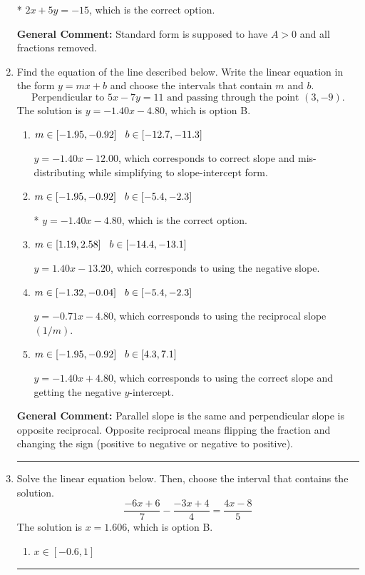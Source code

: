 \documentclass{extbook}[14pt]
\newcommand{\litem}[1]{\item #1

\rule{\textwidth}{0.4pt}}
\begin{document}
\begin{enumerate}
{\begin{enumerate}[label=\Alph*.]
* $2x + 5y = -15$, which is the correct option.
\end{enumerate}

\textbf{General Comment:} Standard form is supposed to have $A > 0$ and all fractions removed.
}
\litem{
Find the equation of the line described below. Write the linear equation in the form $ y=mx+b $ and choose the intervals that contain $m$ and $b$.
\[ \text{Perpendicular to } 5 x - 7 y = 11 \text{ and passing through the point } (3, -9). \]The solution is \( y = -1.40x - 4.80 \), which is option B.\begin{enumerate}[label=\Alph*.]
\item \( m \in [-1.95, -0.92] \hspace*{3mm} b \in [-12.7, -11.3] \)

 $y = -1.40x - 12.00$, which corresponds to correct slope and mis-distributing while simplifying to slope-intercept form.
\item \( m \in [-1.95, -0.92] \hspace*{3mm} b \in [-5.4, -2.3] \)

* $y = -1.40x - 4.80$, which is the correct option.
\item \( m \in [1.19, 2.58] \hspace*{3mm} b \in [-14.4, -13.1] \)

 $y = 1.40x - 13.20$, which corresponds to using the negative slope.
\item \( m \in [-1.32, -0.04] \hspace*{3mm} b \in [-5.4, -2.3] \)

 $y = -0.71x - 4.80$, which corresponds to using the reciprocal slope $(1/m)$.
\item \( m \in [-1.95, -0.92] \hspace*{3mm} b \in [4.3, 7.1] \)

 $y = -1.40x + 4.80$, which corresponds to using the correct slope and getting the negative $y$-intercept.
\end{enumerate}

\textbf{General Comment:} Parallel slope is the same and perpendicular slope is opposite reciprocal. Opposite reciprocal means flipping the fraction and changing the sign (positive to negative or negative to positive).
}
\litem{
Solve the linear equation below. Then, choose the interval that contains the solution.
\[ \frac{-6x + 6}{7} - \frac{-3x + 4}{4} = \frac{4x -8}{5} \]The solution is \( x = 1.606 \), which is option B.\begin{enumerate}[label=\Alph*.]
\item \( x \in [-0.6, 1] \)


\end{enumerate}}
\end{enumerate}
\end{document}
